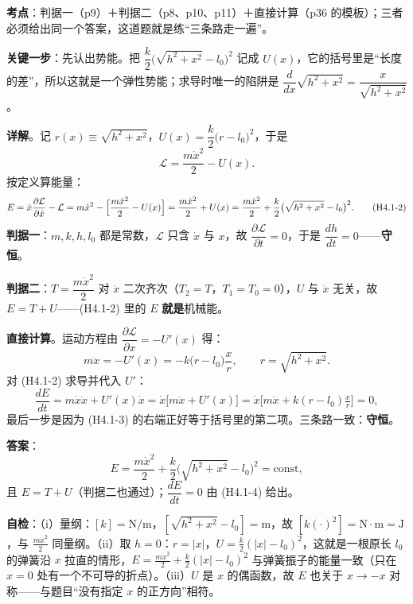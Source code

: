 \documentclass[11pt]{ctexart}
\begin{document}

\textbf{考点}：判据一（p9）＋判据二（p8、p10、p11）＋直接计算（p36 的模板）；三者必须给出同一个答案，这道题就是练“三条路走一遍”。

\textbf{关键一步}：先认出势能。把 $\dfrac{k}{2}\bigl(\sqrt{h^2+x^2}-l_0\bigr)^2$ 记成 $U(x)$，它的括号里是“长度的差”，所以这就是一个弹性势能；求导时唯一的陷阱是 $\dfrac{d}{dx}\sqrt{h^2+x^2}=\dfrac{x}{\sqrt{h^2+x^2}}$。

\textbf{详解}。记 $r(x)\equiv\sqrt{h^2+x^2}$，$U(x)=\dfrac{k}{2}\bigl(r-l_0\bigr)^2$，于是
\[
\mathcal{L}=\frac{m\dot x^2}{2}-U(x). \tag{H4.1-1}
\]
按定义算能量：
\[
E=\dot x\frac{\partial\mathcal{L}}{\partial\dot x}-\mathcal{L}
=m\dot x^2-\Bigl[\frac{m\dot x^2}{2}-U(x)\Bigr]
=\frac{m\dot x^2}{2}+U(x)
=\frac{m\dot x^2}{2}+\frac{k}{2}\bigl(\sqrt{h^2+x^2}-l_0\bigr)^2 . \tag{H4.1-2}
\]
\textbf{判据一}：$m,k,h,l_0$ 都是常数，$\mathcal{L}$ 只含 $\dot x$ 与 $x$，故 $\dfrac{\partial\mathcal{L}}{\partial t}=0$，于是 $\dfrac{dh}{dt}=0$——\textbf{守恒}。

\textbf{判据二}：$T=\dfrac{m\dot x^2}{2}$ 对 $\dot x$ 二次齐次（$T_2=T$，$T_1=T_0=0$），$U$ 与 $\dot x$ 无关，故 $E=T+U$——(H4.1-2) 里的 $E$ \textbf{就是}机械能。

\textbf{直接计算}。运动方程由 $\dfrac{\partial\mathcal{L}}{\partial x}=-U'(x)$ 得：
\[
m\ddot x=-U'(x)=-k\bigl(r-l_0\bigr)\frac{x}{r},\qquad r=\sqrt{h^2+x^2}. \tag{H4.1-3}
\]
对 (H4.1-2) 求导并代入 $U'$：
\[
\frac{dE}{dt}=m\dot x\ddot x+U'(x)\dot x
=\dot x\bigl[m\ddot x+U'(x)\bigr]
=\dot x\bigl[m\ddot x+k(r-l_0)\tfrac{x}{r}\bigr]=0 , \tag{H4.1-4}
\]
最后一步是因为 (H4.1-3) 的右端正好等于括号里的第二项。三条路一致：\textbf{守恒}。

\textbf{答案}：
\[
E=\frac{m\dot x^2}{2}+\frac{k}{2}\bigl(\sqrt{h^2+x^2}-l_0\bigr)^2=\text{const},
\]
且 $E=T+U$（判据二也通过）；$\dfrac{dE}{dt}=0$ 由 (H4.1-4) 给出。

\textbf{自检}：（i）量纲：$[k]=\mathrm{N/m}$，$[\sqrt{h^2+x^2}-l_0]=\mathrm{m}$，故 $[k(\cdot)^2]=\mathrm{N\cdot m}=\mathrm{J}$，与 $\frac{m\dot x^2}{2}$ 同量纲。（ii）取 $h=0$：$r=|x|$，$U=\frac{k}{2}(|x|-l_0)^2$，这就是一根原长 $l_0$ 的弹簧沿 $x$ 拉直的情形，$E=\frac{m\dot x^2}{2}+\frac{k}{2}(|x|-l_0)^2$ 与弹簧振子的能量一致（只在 $x=0$ 处有一个不可导的折点）。（iii）$U$ 是 $x$ 的偶函数，故 $E$ 也关于 $x\to-x$ 对称——与题目“没有指定 $x$ 的正方向”相符。

\end{document}
